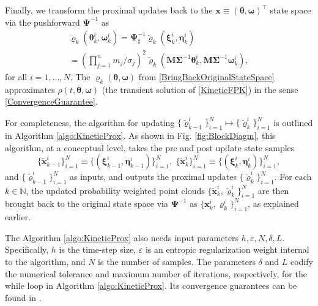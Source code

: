 \documentclass[10pt,twocolumn]{IEEEtran}
\begin{document}
Finally, we transform the proximal updates back to the $\bm{x}\equiv\left(\bm{\theta},\bm{\omega}\right)^{\top}$ state space via the pushforward $\bm{\Psi}^{-1}$ as
\begin{multline}
\varrho_{k}\left(\bm{\theta}_{k}^{i},\bm{\omega}_{k}^{i}\right) = \bm{\Psi}^{-1}_{\sharp} \tilde{\varrho}_{k}\left(\bm{\xi}_{k}^{i},\bm{\eta}_{k}^{i}\right) \\
= \left(\prod_{j=1}^{n}m_{j}/\sigma_{j}\right)^{\!\!2}\tilde{\varrho}_{k}\left(\bm{M}\bm{\Sigma}^{-1}\bm{\theta}_{k}^{i},\bm{M}\bm{\Sigma}^{-1}\bm{\omega}_{k}^{i}\right),
\label{BringBackOriginalStateSpace}	
\end{multline}
for all $i=1,\hdots,N$. The $\varrho_{k}\left(\bm{\theta},\bm{\omega}\right)$ from \eqref{BringBackOriginalStateSpace} approximates $\rho(t,\bm{\theta},\bm{\omega})$ (the transient solution of \eqref{KineticFPK}) in the sense \eqref{ConvergenceGuarantee}. 

For completeness, the algorithm  for updating $\{\tilde{\varrho}_{k-1}^{i}\}_{i=1}^{N}\mapsto\{\tilde{\varrho}_{k}^{i}\}_{i=1}^{N}$ is outlined in Algorithm \ref{algo:KineticProx}. As shown in Fig. \ref{fig:BlockDiagm}, this algorithm, at a conceptual level, takes the pre and post update state samples 
\[\{\tilde{\bm{x}}_{k-1}^{i}\}_{i=1}^{N}\equiv\{\left(\bm{\xi}_{k-1}^{i},\bm{\eta}_{k-1}^{i}\right)\}_{i=1}^{N}, \; \{\tilde{\bm{x}}_{k}^{i}\}_{i=1}^{N}\equiv\{\left(\bm{\xi}_{k}^{i},\bm{\eta}_{k}^{i}\right)\}_{i=1}^{N},\]
and $\{\tilde{\varrho}_{k-1}^{i}\}_{i=1}^{N}$ as inputs, and outputs the proximal updates $\{\tilde{\varrho}_{k}^{i}\}_{i=1}^{N}$. For each $k\in\mathbb{N}$, the updated probability weighted point clouds $\{\tilde{\bm{x}}_{k}^{i},\tilde{\varrho}_{k}^{i}\}_{i=1}^{N}$ are then brought back to the original state space via $\bm{\Psi}^{-1}$ as $\{\bm{x}_{k}^{i},\varrho_{k}^{i}\}_{i=1}^{N}$, as explained earlier.


The Algorithm \ref{algo:KineticProx} also needs input parameters $h,\varepsilon,N,\delta,L$. Specifically, $h$ is the time-step size, $\varepsilon$ is an entropic regularization weight internal to the  algorithm, and $N$ is the number of samples. The parameters $\delta$ and $L$ codify the numerical tolerance and maximum number of iterations, respectively, for the while loop in Algorithm \ref{algo:KineticProx}. Its convergence guarantees can be found in \cite[Sec. III.C]{caluya2019TAC}.
\end{document}
